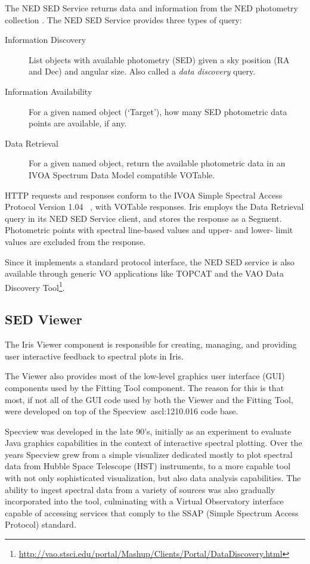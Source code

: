 \documentclass[final,5p,authoryear]{elsarticle}
\begin{document}
The NED SED Service returns data and information from the NED photometry
collection \citep{2007ASPC..376..153M}. The NED SED Service provides three types
of query: \begin{description} \item[Information Discovery] List objects with
available photometry (SED) given a sky position (RA and Dec) and angular size.
Also called a \emph{data discovery} query.  \item[Information Availability] For
a given named object (`Target'), how many SED photometric data points are
available, if any.  \item[Data Retrieval] For a given named object, return the
available photometric data in an IVOA Spectrum Data Model compatible VOTable.
\end{description}

HTTP requests and responses conform to the IVOA Simple Spectral Access Protocol
Version 1.04 ~\citep[SSAP;][]{2012arXiv1203.5725T}, with VOTable responses. Iris
employs the Data Retrieval query in its NED SED Service client, and stores the
response as a Segment. Photometric points with spectral line-based values and
upper- and lower- limit values are excluded from the response.

Since it implements a standard protocol interface, the NED SED service is also
available through generic VO applications like TOPCAT and the VAO Data Discovery
Tool\footnote{\url{http://vao.stsci.edu/portal/Mashup/Clients/Portal/DataDiscovery.html}}.

\subsection{SED Viewer} \label{subsec:specview}
The Iris Viewer component is responsible for creating, managing, and providing
user interactive feedback to spectral plots in Iris.

The Viewer also provides most of the low-level graphics user interface (GUI)
components used by the Fitting Tool component. The reason for this is that most,
if not all of the GUI code used by both the Viewer and the Fitting Tool, were
developed on top of the Specview~ascl:1210.016 \citep{2002ASPC..281..120B} code base.

Specview was developed in the late 90's, initially as an experiment to evaluate
Java graphics capabilities in the context of interactive spectral plotting. Over
the years Specview grew from a simple visualizer dedicated mostly to plot
spectral data from Hubble Space Telescope (HST) instruments, to a more capable
tool with not only sophisticated visualization, but also data analysis
capabilities. The ability to ingest spectral data from a variety of sources was
also gradually incorporated into the tool, culminating with a Virtual
Observatory interface capable of accessing services that comply to the SSAP
(Simple Spectrum Access Protocol) standard.
\end{document}

